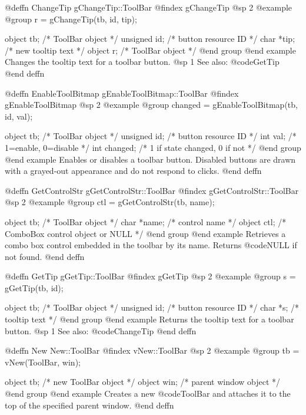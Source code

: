 @deffn {ChangeTip} gChangeTip::ToolBar
@findex gChangeTip
@sp 2
@example
@group
r = gChangeTip(tb, id, tip);

object    tb;    /*  ToolBar object            */
unsigned  id;    /*  button resource ID         */
char      *tip;  /*  new tooltip text           */
object    r;     /*  ToolBar object             */
@end group
@end example
Changes the tooltip text for a toolbar button.
@sp 1
See also:  @code{GetTip}
@end deffn



@deffn {EnableToolBitmap} gEnableToolBitmap::ToolBar
@findex gEnableToolBitmap
@sp 2
@example
@group
changed = gEnableToolBitmap(tb, id, val);

object    tb;       /*  ToolBar object              */
unsigned  id;       /*  button resource ID           */
int       val;      /*  1=enable, 0=disable          */
int       changed;  /*  1 if state changed, 0 if not */
@end group
@end example
Enables or disables a toolbar button.  Disabled buttons are drawn with
a grayed-out appearance and do not respond to clicks.
@end deffn



@deffn {GetControlStr} gGetControlStr::ToolBar
@findex gGetControlStr::ToolBar
@sp 2
@example
@group
ctl = gGetControlStr(tb, name);

object  tb;     /*  ToolBar object                     */
char    *name;  /*  control name                        */
object  ctl;    /*  ComboBox control object or NULL     */
@end group
@end example
Retrieves a combo box control embedded in the toolbar by its name.
Returns @code{NULL} if not found.
@end deffn



@deffn {GetTip} gGetTip::ToolBar
@findex gGetTip
@sp 2
@example
@group
s = gGetTip(tb, id);

object    tb;   /*  ToolBar object       */
unsigned  id;   /*  button resource ID    */
char      *s;   /*  tooltip text          */
@end group
@end example
Returns the tooltip text for a toolbar button.
@sp 1
See also:  @code{ChangeTip}
@end deffn



@deffn {New} New::ToolBar
@findex vNew::ToolBar
@sp 2
@example
@group
tb = vNew(ToolBar, win);

object  tb;    /*  new ToolBar object    */
object  win;   /*  parent window object  */
@end group
@end example
Creates a new @code{ToolBar} and attaches it to the top of the specified
parent window.
@end deffn



